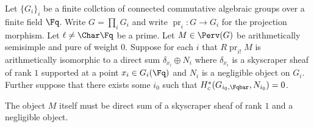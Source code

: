\begin{proposition}
    Let $\{G_i\}_{i}$ be a finite collction of connected commutative algebraic groups over a finite field $\Fq$. Write $G = \prod_i G_i$ and write $\operatorname{pr}_i: G \to G_i$ for the projection morphism. Let $\ell \neq \Char \Fq$ be a prime. 
    Let $M \in \Perv(G)$ be arithmetically semisimple and pure of weight $0$. Suppose for each $i$ that $R\operatorname{pr}_{i!} M$ is arithmetically isomorphic to a direct sum $\delta_{x_i} \oplus N_i$ where $\delta_{x_i}$ is a skyscraper sheaf of rank $1$ supported at a point $x_i \in G_i(\Fq)$ and $N_i$ is a negligible object on $G_i$. Further suppose that there exists some $i_0$ such that $H_c^*(G_{i_0, \Fqbar}, N_{i_0}) = 0$.
    
    The object $M$ itself must be direct sum of a skyscraper sheaf of rank $1$ and a negligible object. 
    
\end{proposition}
